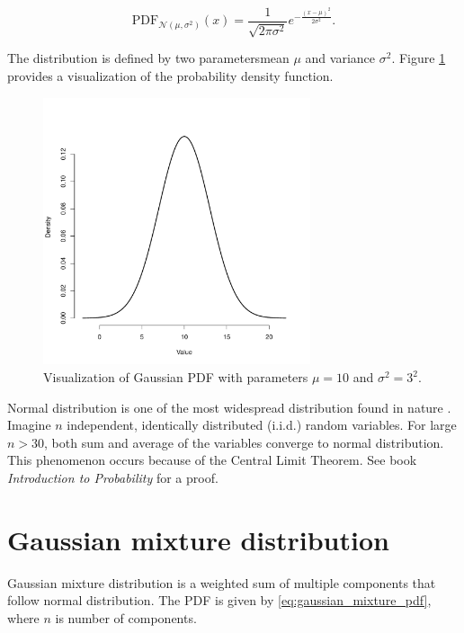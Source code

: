 \documentclass[thesis=B,english]{FITthesis}[2012/06/26]
\begin{document}
\begin{equation} \label{eq:gaussian_pdf}
\text{PDF}_{\mathcal{N}(\mu,\sigma^2)}(x) = \frac{1}{\sqrt{2 \pi \sigma^2}}e^{-\frac{(x-\mu)^2}{2 \sigma^2}}.
\end{equation}

The distribution is defined by two parameters\textemdash mean $\mu$ and variance $\sigma^2$. Figure \ref{fig:gaussian} provides a visualization of the probability density function.

\begin{figure}
	\centering
 	\includegraphics[width=0.7\textwidth]{gaussian}
 	\caption{Visualization of Gaussian PDF with parameters $\mu=10$ and $\sigma^2=3^2$.}
 	\label{fig:gaussian}
\end{figure}

Normal distribution is one of the most widespread distribution found in nature \cite{gaussian-distribution-widespread}. Imagine $n$ independent, identically distributed (i.i.d.) random variables. For large $n > 30$, both sum and average of the variables converge to normal distribution. This phenomenon occurs because of the Central Limit Theorem. See book \textit{Introduction to Probability} \cite{clt-proof} for a proof.

\section{Gaussian mixture distribution}

Gaussian mixture distribution is a weighted sum of multiple components that follow normal distribution. The PDF is given by \ref{eq:gaussian_mixture_pdf}, where $n$ is number of components.
\end{document}

